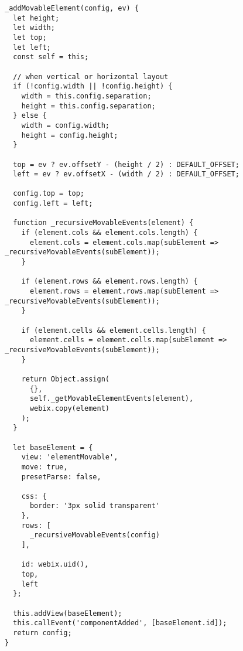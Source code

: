 \begin{lstlisting}
_addMovableElement(config, ev) {
  let height;
  let width;
  let top;
  let left;
  const self = this;

  // when vertical or horizontal layout
  if (!config.width || !config.height) {
    width = this.config.separation;
    height = this.config.separation;
  } else {
    width = config.width;
    height = config.height;
  }

  top = ev ? ev.offsetY - (height / 2) : DEFAULT_OFFSET;
  left = ev ? ev.offsetX - (width / 2) : DEFAULT_OFFSET;

  config.top = top;
  config.left = left;

  function _recursiveMovableEvents(element) {
    if (element.cols && element.cols.length) {
      element.cols = element.cols.map(subElement => _recursiveMovableEvents(subElement));
    }

    if (element.rows && element.rows.length) {
      element.rows = element.rows.map(subElement => _recursiveMovableEvents(subElement));
    }

    if (element.cells && element.cells.length) {
      element.cells = element.cells.map(subElement => _recursiveMovableEvents(subElement));
    }

    return Object.assign(
      {},
      self._getMovableElementEvents(element),
      webix.copy(element)
    );
  }

  let baseElement = {
    view: 'elementMovable',
    move: true,
    presetParse: false,

    css: {
      border: '3px solid transparent'
    },
    rows: [
      _recursiveMovableEvents(config)
    ],

    id: webix.uid(),
    top,
    left
  };

  this.addView(baseElement);
  this.callEvent('componentAdded', [baseElement.id]);
  return config;
}
\end{lstlisting}